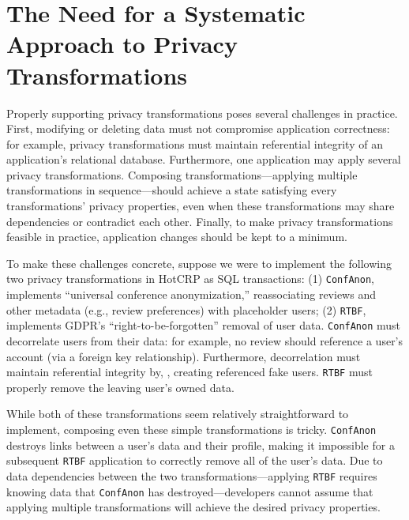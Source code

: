 \section{The Need for a Systematic Approach to Privacy Transformations}
Properly supporting privacy transformations poses several challenges in practice. First, modifying or
deleting data must not compromise application correctness: for example, privacy transformations must
maintain referential integrity of an application's relational database. 
%
Furthermore, one application may apply several privacy transformations. Composing
transformations---applying multiple transformations in sequence---should achieve a state satisfying
every transformations' privacy properties, even when these transformations may share dependencies or
contradict each other. 
%
Finally, to make privacy transformations feasible in practice, application changes should be kept to
a minimum. 
%

%
To make these challenges concrete, suppose we were to implement the following two privacy
transformations in HotCRP as SQL transactions: (1) \texttt{ConfAnon}, implements ``universal conference
anonymization,'' reassociating reviews and other metadata (e.g., review preferences) with
placeholder users; (2) \texttt{RTBF}, implements GDPR's ``right-to-be-forgotten'' removal of user data. 
\texttt{ConfAnon} must decorrelate users from their data: for example, no review should reference a
user's account (via a foreign key relationship). Furthermore, 
decorrelation must maintain referential integrity by, \eg, creating referenced fake users.
\texttt{RTBF} must properly remove the leaving user's owned data.

While both of these transformations seem relatively straightforward to implement, composing even
these simple transformations is tricky. \texttt{ConfAnon} destroys links between a user's data and
their profile, making it impossible for a subsequent \texttt{RTBF} application to correctly remove
all of the user's data. Due to data dependencies between the two transformations---applying
\texttt{RTBF} requires knowing data that \texttt{ConfAnon} has destroyed---developers cannot assume
that applying multiple transformations will achieve the desired privacy properties.
%


